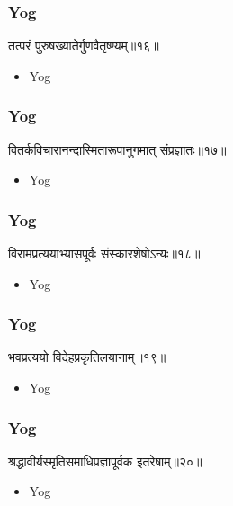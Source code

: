 \begin{frame}[fragile]\frametitle{Yog}
\begin{sanskrit}
तत्परं पुरुषख्यातेर्गुणवैतृष्ण्यम्॥१६॥
\end{sanskrit}
	\begin{itemize}
	\item Yog 
	\end{itemize}
\end{frame}



\begin{frame}[fragile]\frametitle{Yog}
\begin{sanskrit}
वितर्कविचारानन्दास्मितारूपानुगमात् संप्रज्ञातः॥१७॥
\end{sanskrit}
	\begin{itemize}
	\item Yog 
	\end{itemize}
\end{frame}

\begin{frame}[fragile]\frametitle{Yog}
\begin{sanskrit}
विरामप्रत्ययाभ्यासपूर्वः संस्कारशेषोऽन्यः॥१८॥
\end{sanskrit}
	\begin{itemize}
	\item Yog 
	\end{itemize}
\end{frame}


\begin{frame}[fragile]\frametitle{Yog}
\begin{sanskrit}
भवप्रत्ययो विदेहप्रकृतिलयानाम्॥१९॥
\end{sanskrit}
	\begin{itemize}
	\item Yog 
	\end{itemize}
\end{frame}

\begin{frame}[fragile]\frametitle{Yog}
\begin{sanskrit}
श्रद्धावीर्यस्मृतिसमाधिप्रज्ञापूर्वक इतरेषाम्॥२०॥
\end{sanskrit}
	\begin{itemize}
	\item Yog 
	\end{itemize}
\end{frame}

